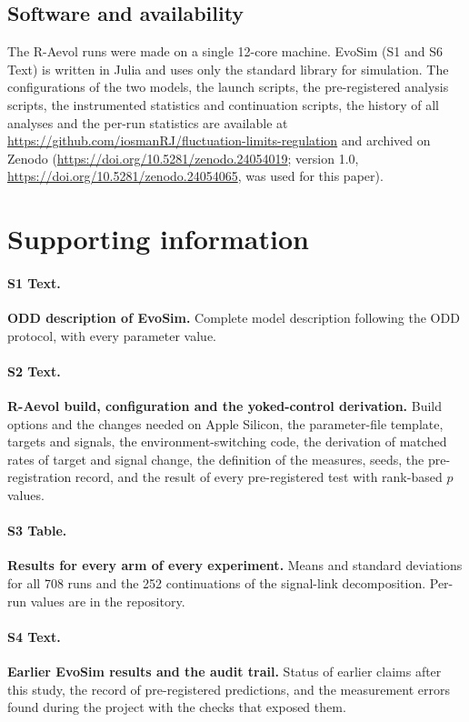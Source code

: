 \documentclass[10pt,letterpaper]{article}
\begin{document}
\subsection*{Software and availability}
The R-Aevol runs were made on a single 12-core machine. EvoSim (S1 and S6 Text)
is written in Julia and uses only the standard library for simulation. The configurations of the two models, the launch scripts, the pre-registered analysis
scripts, the instrumented statistics and continuation scripts, the history of
all analyses and the per-run statistics are available at
\url{https://github.com/iosmanRJ/fluctuation-limits-regulation} and archived on
Zenodo (\url{https://doi.org/10.5281/zenodo.24054019}; version 1.0,
\url{https://doi.org/10.5281/zenodo.24054065}, was used for this paper).

\section*{Supporting information}

\paragraph*{S1 Text.}
\label{S1_Text}
{\bf ODD description of EvoSim.} Complete model description following the ODD
protocol, with every parameter value.

\paragraph*{S2 Text.}
\label{S2_Text}
{\bf R-Aevol build, configuration and the yoked-control derivation.} Build
options and the changes needed on Apple Silicon, the parameter-file template,
targets and signals, the environment-switching code, the derivation of matched
rates of target and signal change, the definition of the measures, seeds, the pre-registration
record, and the result of every pre-registered test with rank-based $p$ values.

\paragraph*{S3 Table.}
\label{S3_Table}
{\bf Results for every arm of every experiment.} Means and standard deviations for
all 708 runs and the 252 continuations of the signal-link decomposition. Per-run values are in the repository.

\paragraph*{S4 Text.}
\label{S4_Text}
{\bf Earlier EvoSim results and the audit trail.} Status of earlier claims after
this study, the record of pre-registered predictions, and the measurement errors
found during the project with the checks that exposed them.
\end{document}

